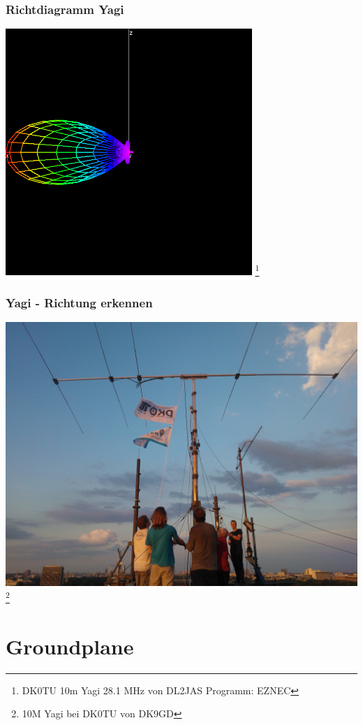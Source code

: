 \begin{frame}
    \frametitle{Richtdiagramm Yagi}
    \begin{center}
        \includegraphics[width=0.7\textwidth]{e11/yagi_gain.png}
        \footnote{\tiny DK0TU 10m Yagi 28.1 MHz von DL2JAS Programm: EZNEC}
	\end{center}
\end{frame}

\begin{frame}
    \frametitle{Yagi - Richtung erkennen}
    \begin{center}
        \includegraphics[width=.9\textwidth]{e11/yagi.jpg}
        \footnote{\tiny 10M Yagi bei DK0TU von DK9GD}
	\end{center}
\end{frame}


\section*{Groundplane}


